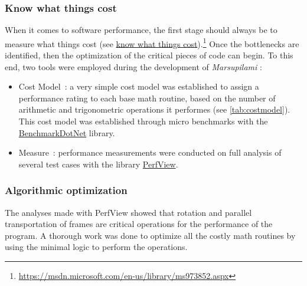 \subsubsection{Know what things cost}
When it comes to software performance, the first stage should always be to measure what things cost (see \href{https://msdn.microsoft.com/en-us/library/ms973852.aspx}{know what things cost}).\footnote{\url{https://msdn.microsoft.com/en-us/library/ms973852.aspx}} Once the bottlenecks are identified,
then the optimization of the critical pieces of code can begin. To this end, two tools were employed during the development of \emph{Marsupilami} :
\begin{itemize}
\item Cost Model~: a very simple cost model was established to assign a performance rating to each base math routine, based on the number of arithmetic and trigonometric  operations it performes (see \cref{tab:costmodel}). This cost model was established through micro benchmarks with the \href{https://github.com/Microsoft/perfview}{BenchmarkDotNet} library.
\item Measure~: performance measurements were conducted on full analysis of several test cases with the library \href{https://github.com/Microsoft/perfview}{PerfView}.
\end{itemize}




\subsubsection{Algorithmic optimization}
The analyses made with PerfView showed that rotation and parallel transportation of frames are critical operations for the performance of the program. A thorough work was done to optimize all the costly math routines by using the minimal logic to perform the operations.

